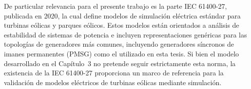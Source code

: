 De particular relevancia para el presente trabajo es la parte 
IEC 61400-27, publicada en 2020, la cual define modelos de simulación 
eléctrica estándar para turbinas eólicas y parques eólicos. Estos 
modelos están orientados a análisis de estabilidad de sistemas de 
potencia e incluyen representaciones genéricas para las topologías 
de generadores más comunes, incluyendo generadores síncronos de imanes 
permanentes (PMSG) como el utilizado en esta tesis. Si bien el modelo 
desarrollado en el Capítulo~3 no pretende seguir estrictamente esta 
norma, la existencia de la IEC 61400-27 proporciona un marco de 
referencia para la validación de modelos eléctricos de turbinas eólicas 
mediante simulación.








